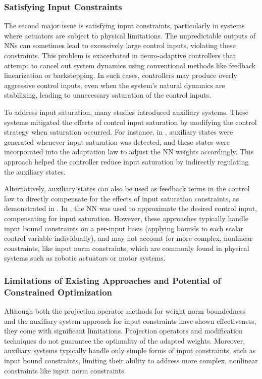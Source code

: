 \documentclass[final,5p,times,twocolumn,authoryear]{elsarticle}
\begin{document}
\subsubsection{Satisfying Input Constraints}

The second major issue is satisfying input constraints, particularly in systems where actuators are subject to physical limitations. 
The unpredictable outputs of NNs can sometimes lead to excessively large control inputs, violating these constraints. 
This problem is exacerbated in neuro-adaptive controllers that attempt to cancel out system dynamics using conventional methods like feedback linearization or backstepping. 
In such cases, controllers may produce overly aggressive control inputs, even when the system's natural dynamics are stabilizing, leading to unnecessary saturation of the control inputs.

To address input saturation, many studies introduced auxiliary systems. 
These systems mitigated the effects of control input saturation by modifying the control strategy when saturation occurred. 
For instance, in \cite{Esfandiari:2014aa,Karason:1994aa,Esfandiari:2015aa}, auxiliary states were generated whenever input saturation was detected, and these states were incorporated into the adaptation law to adjust the NN weights accordingly. 
This approach helped the controller reduce input saturation by indirectly regulating the auxiliary states.

Alternatively, auxiliary states can also be used as feedback terms in the control law to directly compensate for the effects of input saturation constraints, as demonstrated in \cite{Arefinia:2020aa,He:2016aa,Peng:2020aa}. 
In \cite{Gao:2006aa}, the NN was used to approximate the desired control input, compensating for input saturation. 
However, these approaches typically handle input bound constraints on a per-input basis (\ie applying bounds to each scalar control variable individually), and may not account for more complex, nonlinear constraints, like input norm constraints, which are commonly found in physical systems such as robotic actuators or motor systems.

\subsubsection{Limitations of Existing Approaches and Potential of Constrained Optimization}

Although both the projection operator methods for weight norm boundedness and the auxiliary system approach for input constraints have shown effectiveness, they come with significant limitations. 
Projection operators and modification techniques do not guarantee the optimality of the adapted weights. 
Moreover, auxiliary systems typically handle only simple forms of input constraints, such as input bound constraints, limiting their ability to address more complex, nonlinear constraints like input norm constraints.
\end{document}
